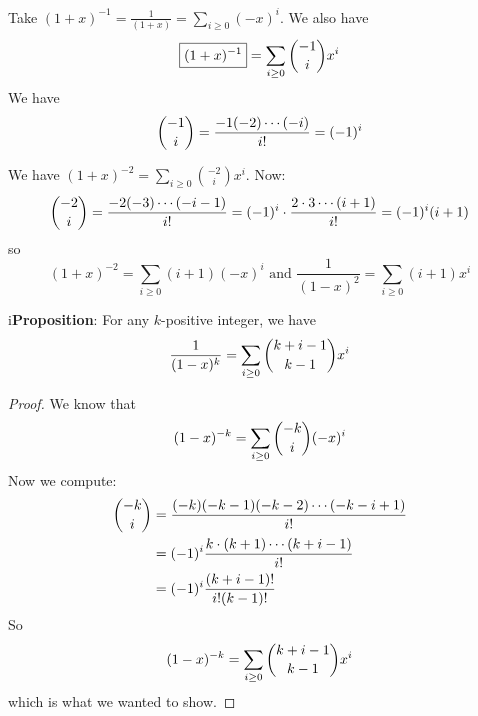 \documentclass{report}
\begin{document}
\begin{examples}
    \begin{example}
        Take $(1 + x)^{-1} = \frac{1}{(1 + x)} = \sum_{i \geq 0}(-x)^{i}$. We also have
            \begin{equation*}
                \boxed{(1 + x)^{-1}} = \sum_{i\geq 0}\dbinom{-1}{i}x^{i}
            \end{equation*}
        We have 
            \begin{equation*}
                \dbinom{-1}{i} = \dfrac{-1(-2)\cdots (-i)}{i!} = (-1)^{i}
            \end{equation*}
    \end{example}
    \begin{example}
        We have $(1 + x)^{-2} = \sum_{i \geq 0}\binom{-2}{i}x^{i}$. Now:
            \begin{equation*}
                \dbinom{-2}{i} = \dfrac{-2(-3)\cdots (-i - 1)}{i!} = (-1)^{i}\cdot \dfrac{2 \cdot 3 \cdots (i + 1)}{i!} = (-1)^{i}(i + 1)
            \end{equation*}
        so 
            \begin{equation*}
                (1 + x)^{-2} = \sum_{i \geq 0}(i + 1)(-x)^{i} \text{ and } \dfrac{1}{(1 - x)^{2}} = \sum_{i \geq 0}(i + 1)x^{i}
            \end{equation*}
    \end{example}
\end{examples}

i\textbf{Proposition}: For any $k$-positive integer, we have
    \begin{equation*}
        \dfrac{1}{(1 - x)^{k}} = \sum_{i \geq 0} \dbinom{k + i - 1}{k - 1}x^{i}
    \end{equation*}
\begin{proof}
    We know that 
        \begin{equation*}
            (1 - x)^{-k} = \sum_{i \geq 0} \dbinom{-k}{i} (-x)^{i}
        \end{equation*}
    Now we compute:
        \begin{align*}
            \dbinom{-k}{i} &= \dfrac{(-k)(-k - 1)(-k -2) \cdots (-k - i + 1)}{i!} \\
                           &= (-1)^{i} \dfrac{k \cdot (k + 1) \cdots (k + i - 1)}{i!} \\
                           &= (-1)^{i}\dfrac{(k + i - 1)!}{i!(k - 1)!}
        \end{align*}
    So
        \begin{equation*}
            (1 - x)^{-k} = \sum_{i \geq 0}\dbinom{k + i - 1}{k - 1}x^{i}
        \end{equation*}
    which is what we wanted to show.
\end{proof}
\end{document}

